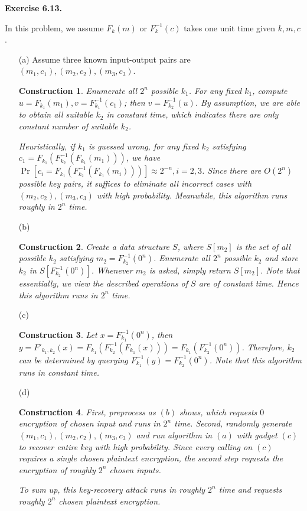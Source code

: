 \documentclass[a4paper]{article}
\newtheorem{construction}{Construction}
\newenvironment{exercise}[1]{
	\par
	\noindent\textbf{Exercise #1.}\quad
}{
	\par
	\bigskip
}
\newcommand{\sbra}[1]{\left[ #1 \right]}
\begin{document}
\begin{exercise}{6.13}
In this problem, we assume $F_k(m)$ or $F^{-1}_k(c)$ takes one unit time given $k,m,c$.
\begin{itemize}
    \item[(a)] Assume three known input-output pairs are $(m_1,c_1),(m_2,c_2),(m_3,c_3)$.
        \begin{construction}
            Enumerate all $2^n$ possible $k_1$. For any fixed $k_1$, compute $u=F_{k_1}(m_1),v=F^{-1}_{k_1}(c_1)$;
            then $v=F_{k_2}^{-1}(u)$. By assumption, we are able to obtain all suitable $k_2$ in constant time,
            which indicates there are only constant number of suitable $k_2$.

            Heuristically, if $k_1$ is guessed wrong, 
            for any fixed $k_2$ satisfying $c_1=F_{k_1}(F_{k_2}^{-1}(F_{k_1}(m_1)))$,
            we have $\Pr\sbra{c_i=F_{k_1}(F_{k_2}^{-1}(F_{k_1}(m_i)))}\approx 2^{-n},i=2,3$.
            Since there are $O(2^n)$ possible key pairs, it suffices to eliminate 
            all incorrect cases with $(m_2,c_2),(m_3,c_3)$ with high probability. 
            Meanwhile, this algorithm runs roughly in $2^n$ time.
        \end{construction}
    \item[(b)]
        \begin{construction}
            Create a data structure $S$, where $S[m_2]$ is the set of all possible $k_2$ satisfying $m_2=F_{k_2}^{-1}(0^n)$.
            Enumerate all $2^n$ possible $k_2$ and store $k_2$ in $S[F_{k_2}^{-1}(0^n)]$.
            Whenever $m_2$ is asked, simply return $S[m_2]$.
            Note that essentially, we view the described operations of $S$ are of constant time.
            Hence this algorithm runs in $2^n$ time.
        \end{construction}
    \item[(c)]
        \begin{construction}
            Let $x=F^{-1}_{k_1}(0^n)$,
            then $y=F'_{k_1,k_2}(x)=F_{k_1}(F^{-1}_{k_2}(F_{k_1}(x)))=F_{k_1}(F^{-1}_{k_2}(0^n))$.
            Therefore, $k_2$ can be determined by querying $F^{-1}_{k_1}(y)=F^{-1}_{k_2}(0^n)$.
            Note that this algorithm runs in constant time.
        \end{construction}
    \item[(d)]
        \begin{construction}
            First, preprocess as $(b)$ shows, which requests $0$ encryption of chosen input and runs in $2^n$ time.
            Second, randomly generate $(m_1,c_1),(m_2,c_2),(m_3,c_3)$ and run algorithm in $(a)$ with gadget $(c)$ 
            to recover entire key with high probability.
            Since every calling on $(c)$ requires a single chosen plaintext encryption, the second step requests the 
            encryption of roughly $2^n$ chosen inputs.
            
            To sum up, this key-recovery attack runs in roughly $2^n$ time and requests roughly $2^n$ chosen plaintext 
            encryption.
        \end{construction}
\end{itemize}
\end{exercise}
\end{document}
